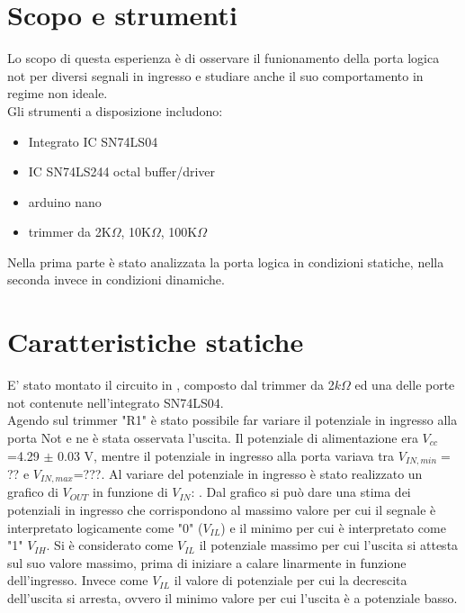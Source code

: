 \section{Scopo e strumenti}
Lo scopo di questa esperienza è di osservare il funionamento della porta logica not per diversi segnali in ingresso e studiare anche il suo comportamento in regime non ideale.\\
Gli strumenti a disposizione includono:
\begin{itemize}
\item{Integrato IC SN74LS04}
\item{IC SN74LS244 octal buffer/driver}
\item{arduino nano}
\item{trimmer da 2K$\Omega$, 10K$\Omega$, 100K$\Omega$}
\end{itemize}
Nella prima parte è stato analizzata la porta logica in condizioni statiche, nella seconda invece in condizioni dinamiche.\\

\section{Caratteristiche statiche}
E' stato montato il circuito in , composto dal trimmer da 2$k\Omega$ ed una delle porte not contenute nell'integrato SN74LS04.\\
 Agendo sul trimmer "R1" è stato possibile far variare il potenziale in ingresso alla porta Not e ne è stata osservata l'uscita. Il potenziale di alimentazione era $V_{cc}$=4.29 $\pm$ 0.03 V, mentre il potenziale in ingresso alla porta  variava tra $V_{IN,min}=$?? e $V_{IN,max}$=???. Al variare del potenziale in ingresso è stato realizzato un grafico di $V_{OUT}$ in funzione di $V_{IN}$: . Dal grafico si può dare una stima dei potenziali in ingresso che corrispondono al massimo valore per cui il segnale è interpretato logicamente come "0" ($V_{IL}$) e il minimo per cui è interpretato come "1" $V_{IH}$. Si è considerato come $V_{IL}$ il potenziale massimo per cui l'uscita si attesta sul suo valore massimo, prima di iniziare a calare linarmente in funzione dell'ingresso. Invece come $V_{IL}$ il valore di potenziale per cui la decrescita dell'uscita si arresta, ovvero il minimo valore per cui l'uscita è a potenziale basso.\\